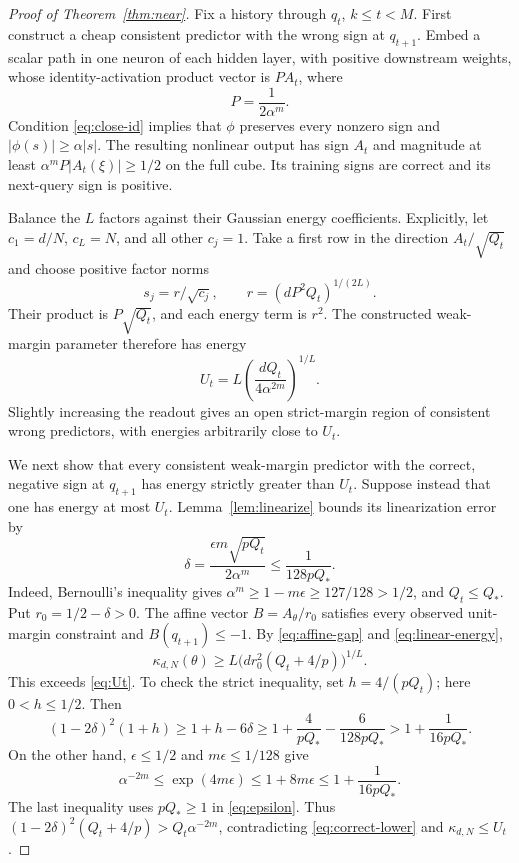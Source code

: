\begin{proof}[Proof of Theorem~\ref{thm:near}]
Fix a history through $q_t$, $k\le t<M$. First construct a cheap
consistent predictor with the wrong sign at $q_{t+1}$. Embed a scalar
path in one neuron of each hidden layer, with positive downstream
weights, whose identity-activation product vector is $P A_t$, where
\[
 P=\frac1{2\alpha^m}.
\]
Condition \eqref{eq:close-id} implies that $\phi$ preserves every
nonzero sign and $|\phi(s)|\ge\alpha|s|$. The resulting nonlinear output
has sign $A_t$ and magnitude at least
$\alpha^m P|A_t(\xi)|\ge1/2$ on the full cube. Its training signs are
correct and its next-query sign is positive.

Balance the $L$ factors against their Gaussian energy coefficients.
Explicitly, let $c_1=d/N$, $c_L=N$, and all other $c_j=1$.
Take a first row in the direction $A_t/\sqrt{Q_t}$ and choose positive
factor norms
\[
 s_j=r/\sqrt{c_j},\qquad
 r=(dP^2Q_t)^{1/(2L)}.
\]
Their product is $P\sqrt{Q_t}$, and each energy term is $r^2$.
The constructed weak-margin parameter therefore has energy
\begin{equation}\label{eq:Ut}
 U_t=L\left(\frac{dQ_t}{4\alpha^{2m}}\right)^{1/L}.
\end{equation}
Slightly increasing the readout gives an open strict-margin region of
consistent wrong predictors, with energies arbitrarily close to $U_t$.

We next show that every consistent weak-margin predictor with the
correct, negative sign at $q_{t+1}$ has energy strictly greater than
$U_t$. Suppose instead that one has energy at most $U_t$.
Lemma~\ref{lem:linearize} bounds its linearization error by
\begin{equation}\label{eq:delta}
 \delta=\frac{\epsilon m\sqrt{pQ_t}}{2\alpha^m}
             \le\frac1{128pQ_*}.
\end{equation}
Indeed, Bernoulli's inequality gives
$\alpha^m\ge1-m\epsilon\ge127/128>1/2$, and
$Q_t\le Q_*$. Put $r_0=1/2-\delta>0$.
The affine vector $B=A_\theta/r_0$ satisfies every observed unit-margin
constraint and $B(q_{t+1})\le-1$. By \eqref{eq:affine-gap} and
\eqref{eq:linear-energy},
\begin{equation}\label{eq:correct-lower}
 \kappa_{d,N}(\theta)\ge
    L\bigl(d r_0^2(Q_t+4/p)\bigr)^{1/L}.
\end{equation}
This exceeds \eqref{eq:Ut}. To check the strict inequality, set
$h=4/(pQ_t)$; here $0<h\le1/2$. Then
\[
 (1-2\delta)^2(1+h)
 \ge1+h-6\delta
 \ge1+\frac4{pQ_*}-\frac6{128pQ_*}
 >1+\frac1{16pQ_*}.
\]
On the other hand, $\epsilon\le1/2$ and $m\epsilon\le1/128$ give
\[
 \alpha^{-2m}\le\exp(4m\epsilon)\le1+8m\epsilon
             \le1+\frac1{16pQ_*}.
\]
The last inequality uses $pQ_*\ge1$ in \eqref{eq:epsilon}.
Thus $(1-2\delta)^2(Q_t+4/p)>Q_t\alpha^{-2m}$, contradicting
\eqref{eq:correct-lower} and $\kappa_{d,N}\le U_t$.


\end{proof}

